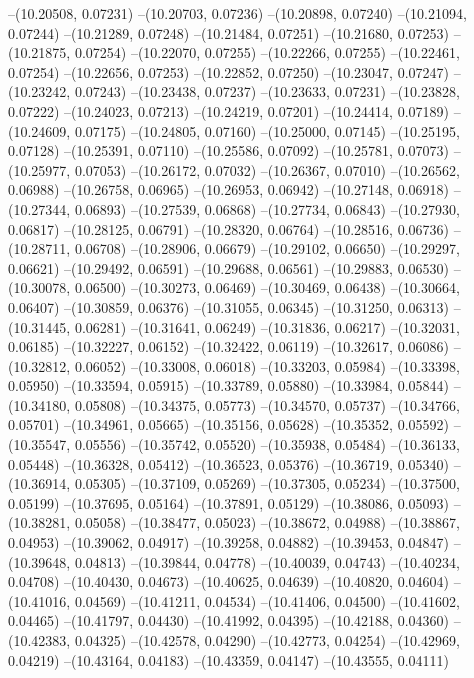 --(10.20508, 0.07231)
--(10.20703, 0.07236)
--(10.20898, 0.07240)
--(10.21094, 0.07244)
--(10.21289, 0.07248)
--(10.21484, 0.07251)
--(10.21680, 0.07253)
--(10.21875, 0.07254)
--(10.22070, 0.07255)
--(10.22266, 0.07255)
--(10.22461, 0.07254)
--(10.22656, 0.07253)
--(10.22852, 0.07250)
--(10.23047, 0.07247)
--(10.23242, 0.07243)
--(10.23438, 0.07237)
--(10.23633, 0.07231)
--(10.23828, 0.07222)
--(10.24023, 0.07213)
--(10.24219, 0.07201)
--(10.24414, 0.07189)
--(10.24609, 0.07175)
--(10.24805, 0.07160)
--(10.25000, 0.07145)
--(10.25195, 0.07128)
--(10.25391, 0.07110)
--(10.25586, 0.07092)
--(10.25781, 0.07073)
--(10.25977, 0.07053)
--(10.26172, 0.07032)
--(10.26367, 0.07010)
--(10.26562, 0.06988)
--(10.26758, 0.06965)
--(10.26953, 0.06942)
--(10.27148, 0.06918)
--(10.27344, 0.06893)
--(10.27539, 0.06868)
--(10.27734, 0.06843)
--(10.27930, 0.06817)
--(10.28125, 0.06791)
--(10.28320, 0.06764)
--(10.28516, 0.06736)
--(10.28711, 0.06708)
--(10.28906, 0.06679)
--(10.29102, 0.06650)
--(10.29297, 0.06621)
--(10.29492, 0.06591)
--(10.29688, 0.06561)
--(10.29883, 0.06530)
--(10.30078, 0.06500)
--(10.30273, 0.06469)
--(10.30469, 0.06438)
--(10.30664, 0.06407)
--(10.30859, 0.06376)
--(10.31055, 0.06345)
--(10.31250, 0.06313)
--(10.31445, 0.06281)
--(10.31641, 0.06249)
--(10.31836, 0.06217)
--(10.32031, 0.06185)
--(10.32227, 0.06152)
--(10.32422, 0.06119)
--(10.32617, 0.06086)
--(10.32812, 0.06052)
--(10.33008, 0.06018)
--(10.33203, 0.05984)
--(10.33398, 0.05950)
--(10.33594, 0.05915)
--(10.33789, 0.05880)
--(10.33984, 0.05844)
--(10.34180, 0.05808)
--(10.34375, 0.05773)
--(10.34570, 0.05737)
--(10.34766, 0.05701)
--(10.34961, 0.05665)
--(10.35156, 0.05628)
--(10.35352, 0.05592)
--(10.35547, 0.05556)
--(10.35742, 0.05520)
--(10.35938, 0.05484)
--(10.36133, 0.05448)
--(10.36328, 0.05412)
--(10.36523, 0.05376)
--(10.36719, 0.05340)
--(10.36914, 0.05305)
--(10.37109, 0.05269)
--(10.37305, 0.05234)
--(10.37500, 0.05199)
--(10.37695, 0.05164)
--(10.37891, 0.05129)
--(10.38086, 0.05093)
--(10.38281, 0.05058)
--(10.38477, 0.05023)
--(10.38672, 0.04988)
--(10.38867, 0.04953)
--(10.39062, 0.04917)
--(10.39258, 0.04882)
--(10.39453, 0.04847)
--(10.39648, 0.04813)
--(10.39844, 0.04778)
--(10.40039, 0.04743)
--(10.40234, 0.04708)
--(10.40430, 0.04673)
--(10.40625, 0.04639)
--(10.40820, 0.04604)
--(10.41016, 0.04569)
--(10.41211, 0.04534)
--(10.41406, 0.04500)
--(10.41602, 0.04465)
--(10.41797, 0.04430)
--(10.41992, 0.04395)
--(10.42188, 0.04360)
--(10.42383, 0.04325)
--(10.42578, 0.04290)
--(10.42773, 0.04254)
--(10.42969, 0.04219)
--(10.43164, 0.04183)
--(10.43359, 0.04147)
--(10.43555, 0.04111)
